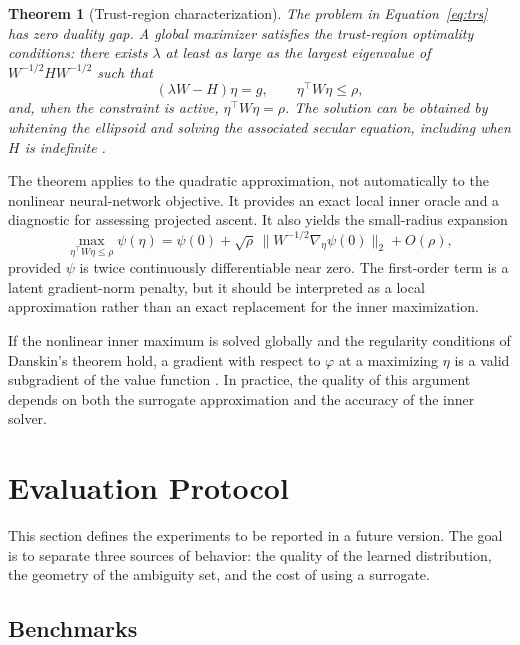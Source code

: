 \documentclass[11pt]{article}
\newtheorem{theorem}{Theorem}
\newcommand{\design}{\varphi}
\begin{document}
\begin{theorem}[Trust-region characterization]
\label{thm:trs}
The problem in Equation~\ref{eq:trs} has zero duality gap. A global maximizer satisfies the
trust-region optimality conditions: there exists $\lambda$ at least as large as the largest
eigenvalue of $W^{-1/2}HW^{-1/2}$ such that
\begin{equation}
  (\lambda W-H)\eta=g,\qquad \eta^\top W\eta\leq\rho,
\end{equation}
and, when the constraint is active, $\eta^\top W\eta=\rho$. The solution can be obtained by
whitening the ellipsoid and solving the associated secular equation, including when $H$ is indefinite
\citep{more1983}.
\end{theorem}

The theorem applies to the quadratic approximation, not automatically to the nonlinear
neural-network objective. It provides an exact local inner oracle and a diagnostic for
assessing projected ascent. It also yields the small-radius expansion
\begin{equation}
  \label{eq:first-order}
  \max_{\eta^\top W\eta\leq\rho}\psi(\eta)
  = \psi(0)+\sqrt{\rho}\,\|W^{-1/2}\nabla_\eta\psi(0)\|_2+O(\rho),
\end{equation}
provided $\psi$ is twice continuously differentiable near zero. The first-order term is a
latent gradient-norm penalty, but it should be interpreted as a local approximation rather
than an exact replacement for the inner maximization.

If the nonlinear inner maximum is solved globally and the regularity conditions of Danskin's
theorem hold, a gradient with respect to $\design$ at a maximizing $\eta$ is a valid
subgradient of the value function \citep{danskin1967}. In practice, the quality of this
argument depends on both the surrogate approximation and the accuracy of the inner solver.

\section{Evaluation Protocol}
\label{sec:experiments}

This section defines the experiments to be reported in a future version. The goal is to
separate three sources of behavior: the quality of the learned distribution, the geometry of
the ambiguity set, and the cost of using a surrogate.

\subsection{Benchmarks}
\end{document}
